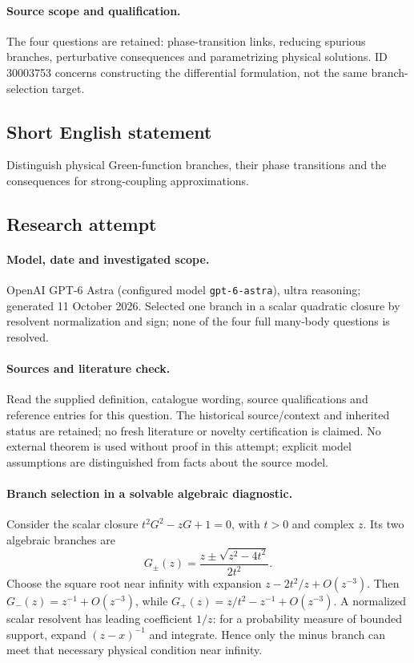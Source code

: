 \documentclass[11pt]{article}
\begin{document}
\paragraph{Source scope and qualification.}
The four questions are retained: phase-transition links, reducing spurious branches, perturbative consequences and parametrizing physical solutions. ID 30003753 concerns constructing the differential formulation, not the same branch-selection target.
\subsection{Short English statement}
Distinguish physical Green-function branches, their phase transitions and the consequences for strong-coupling approximations.
\subsection{Research attempt}
\paragraph{Model, date and investigated scope.}
OpenAI GPT-6 Astra (configured model \texttt{gpt-6-astra}), ultra reasoning; generated 11 October 2026. Selected one branch in a scalar quadratic closure by resolvent normalization and sign; none of the four full many-body questions is resolved.

\paragraph{Sources and literature check.}
Read the supplied definition, catalogue wording, source qualifications and reference entries for this question. The historical source/context and inherited status are retained; no fresh literature or novelty certification is claimed. No external theorem is used without proof in this attempt; explicit model assumptions are distinguished from facts about the source model.

\paragraph{Branch selection in a solvable algebraic diagnostic.} Consider the scalar closure \(t^2G^2-zG+1=0\), with \(t>0\) and complex \(z\). Its two algebraic branches are
\[
 G_\pm(z)=\frac{z\pm\sqrt{z^2-4t^2}}{2t^2}.
\]
Choose the square root near infinity with expansion \(z-2t^2/z+O(z^{-3})\). Then \(G_-(z)=z^{-1}+O(z^{-3})\), while \(G_+(z)=z/t^2-z^{-1}+O(z^{-3})\). A normalized scalar resolvent has leading coefficient \(1/z\): for a probability measure of bounded support, expand \((z-x)^{-1}\) and integrate. Hence only the minus branch can meet that necessary physical condition near infinity.
\end{document}
